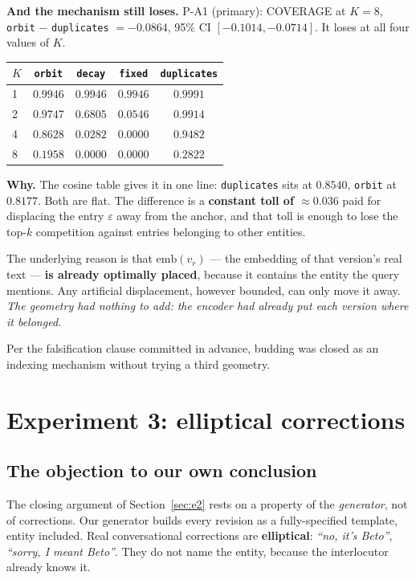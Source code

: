 \documentclass[11pt,a4paper]{article}
\begin{document}
\textbf{And the mechanism still loses.} P-A1 (primary): COVERAGE at $K=8$,
\texttt{orbit} $-$ \texttt{duplicates} $= \mathbf{-0.0864}$, 95\% CI $[-0.1014, -0.0714]$. It loses at
all four values of $K$.

\begin{center}
\begin{tabular}{lcccc}
\toprule
$K$ & \texttt{orbit} & \texttt{decay} & \texttt{fixed} & \texttt{duplicates} \\
\midrule
1 & $0.9946$ & $0.9946$ & $0.9946$ & $0.9991$ \\
2 & $0.9747$ & $0.6805$ & $0.0546$ & $0.9914$ \\
4 & $0.8628$ & $0.0282$ & $0.0000$ & $0.9482$ \\
8 & $0.1958$ & $0.0000$ & $0.0000$ & $0.2822$ \\
\bottomrule
\end{tabular}
\end{center}

\textbf{Why.} The cosine table gives it in one line: \texttt{duplicates} sits at $0.8540$,
\texttt{orbit} at $0.8177$. Both are flat. The difference is a \textbf{constant toll of
$\approx 0.036$} paid for displacing the entry $\varepsilon$ away from the anchor, and that toll is
enough to lose the top-$k$ competition against entries belonging to other entities.

The underlying reason is that $\mathrm{emb}(v_r)$ --- the embedding of that version's real text ---
\textbf{is already optimally placed}, because it contains the entity the query mentions. Any
artificial displacement, however bounded, can only move it away. \emph{The geometry had nothing to
add: the encoder had already put each version where it belonged.}

Per the falsification clause committed in advance, budding was closed as an indexing mechanism
without trying a third geometry.

\section{Experiment 3: elliptical corrections}
\label{sec:e3}

\subsection{The objection to our own conclusion}

The closing argument of Section~\ref{sec:e2} rests on a property of the \emph{generator}, not of
corrections. Our generator builds every revision as a fully-specified template, entity included.
Real conversational corrections are \textbf{elliptical}: \emph{``no, it's Beto''}, \emph{``sorry, I
meant Beto''}. They do not name the entity, because the interlocutor already knows it.
\end{document}
